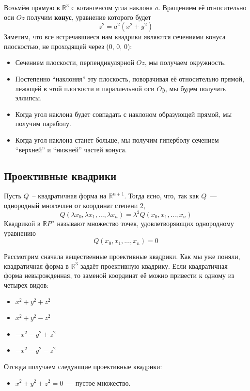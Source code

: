 \documentclass[11pt]{article}
\begin{document}
    \begin{remark}
    Возьмём прямую в $\mathbb{R}^3$ с котангенсом угла наклона $a$. Вращением её относительно оси $Oz$ получим \textbf{конус}, уравнение которого будет
    \begin{equation*}
        z^2 = a^2(x^2 + y^2)
    \end{equation*}
    Заметим, что все встречавшиеся нам квадрики являются сечениями конуса плоскостью, не проходящей через (0, 0, 0):
    \begin{itemize}
        \item Сечением плоскости, перпендикулярной $Oz$, мы получаем окружность.
        \item Постепенно ``наклоняя'' эту плоскость, поворачивая её относительно прямой, лежащей в этой плоскости и параллельной оси $Oy$, мы будем получать эллипсы.
        \item Когда угол наклона будет совпадать с наклоном образующей прямой, мы получим параболу.
        \item Когда угол наклона станет больше, мы получим гиперболу сечением ``верхней'' и ``нижней'' частей конуса.
    \end{itemize}
    \subsection{Проективные квадрики}
    \begin{definition}
        Пусть $Q$~-- квадратичная форма на $\mathbb{R}^{n + 1}$. Тогда ясно, что, так как $Q$~--- однородный многочлен от координат степени 2,
        \[ Q(\lambda x_0, \lambda x_1, \ldots, \lambda x_n) = \lambda^2 Q(x_0, x_1, \ldots, x_n) \]
        Квадрикой в $\mathbb{R}P^n$ называют множество точек, удовлетворяющих однородному уравнению
        \[Q(x_0, x_1, \ldots, x_n) = 0 \]
    \end{definition}
    Рассмотрим сначала вещественные проективные квадрики. Как мы уже поняли, квадратичная форма в  $\mathbb{R}^3$ задаёт
    проективную квадрику.
    Если квадратичная форма невырожденная, то заменой координат её можно привести к одному из четырех видов:
    \begin{itemize}
        \item $x^2 + y^2 + z^2$

        \item $x^2 + y^2 - z^2$

        \item $-x^2 - y^2 + z^2$

        \item $-x^2 - y^2 - z^2$
    \end{itemize}
    Отсюда получаем следующие проективные квадрики:
    \begin{itemize}
        \item $x^2 + y^2 + z^2 = 0$~--- пустое множество.


\end{itemize}
\end{remark}
\end{document}
